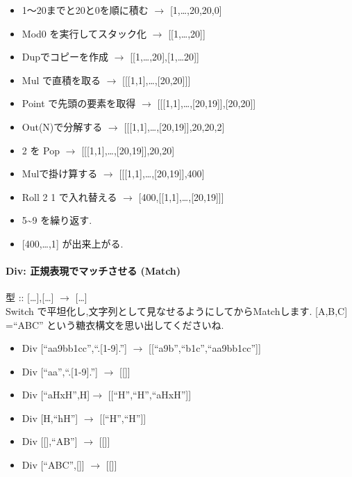 \begin{itemize}
\item
  1〜20までと20と0を順に積む $\to$ {[}1,\ldots{},20,20,0{]}
\item
  Mod0 を実行してスタック化 $\to$ {[}{[}1,\ldots{},20{]}{]}
\item
  Dupでコピーを作成 $\to$
  {[}{[}1,\ldots{},20{]},{[}1,\ldots{}20{]}{]}
\item
  Mul で直積を取る $\to$
  {[}{[}{[}1,1{]},\ldots{},{[}20,20{]}{]}{]}
\item
  Point で先頭の要素を取得 $\to$
  {[}{[}{[}1,1{]},\ldots{},{[}20,19{]}{]},{[}20,20{]}{]}
\item
  Out(N)で分解する $\to$
  {[}{[}{[}1,1{]},\ldots{},{[}20,19{]}{]},20,20,2{]}
\item
  2 を Pop $\to$
  {[}{[}{[}1,1{]},\ldots{},{[}20,19{]}{]},20,20{]}
\item
  Mulで掛け算する $\to$
  {[}{[}{[}1,1{]},\ldots{},{[}20,19{]}{]},400{]}
\item
  Roll 2 1 で入れ替える $\to$
  {[}400,{[}{[}1,1{]},\ldots{},{[}20,19{]}{]}{]}
\item
  5\textasciitilde{}9 を繰り返す.
\item
  {[}400,\ldots{},1{]} が出来上がる.
\end{itemize}

\paragraph{Div: 正規表現でマッチさせる (Match)}

型 :: {[}\ldots{}{]},{[}\ldots{}{]} $\to$
{[}\ldots{}{]}\\Switch
で平坦化し,文字列として見なせるようにしてからMatchします. {[}A,B,C{]}
=``ABC'' という糖衣構文を思い出してくださいね.

\begin{itemize}
\item
  Div {[}``aa9bb1cc'',``.{[}1-9{]}.''{]} $\to$
  {[}{[}``a9b'',``b1c'',``aa9bb1cc''{]}{]}
\item
  Div {[}``aa'',``.{[}1-9{]}.''{]} $\to$ {[}{[}{]}{]}
\item
  Div {[}``aHxH'',H{]}$\to$ {[}{[}``H'',``H'',``aHxH''{]}{]}
\item
  Div {[}H,``h\textbar{}H''{]} $\to$ {[}{[}``H'',``H''{]}{]}
\item
  Div {[}{[}{]},``A\textbar{}B''{]} $\to$ {[}{[}{]}{]}
\item
  Div {[}``ABC'',{[}{]}{]} $\to$ {[}{[}{]}{]}
\end{itemize}

